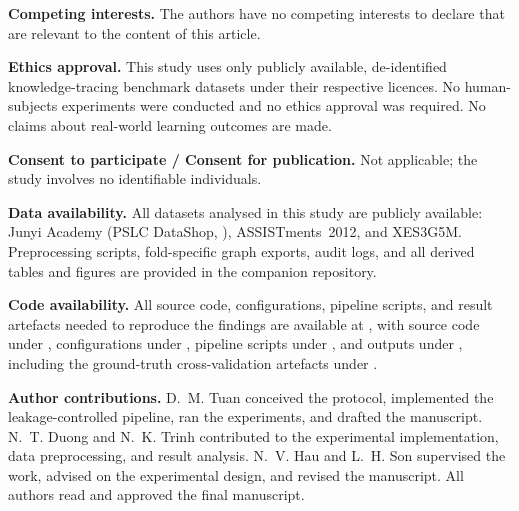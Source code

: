 \documentclass[pdflatex,sn-basic]{sn-jnl}
\begin{document}
\medskip\noindent\textbf{Competing interests.} The authors have no competing
interests to declare that are relevant to the content of this article.

\medskip\noindent\textbf{Ethics approval.} This study uses only publicly
available, de-identified knowledge-tracing benchmark datasets under their
respective licences. No human-subjects experiments were conducted and no ethics
approval was required. No claims about real-world learning outcomes are made.

\medskip\noindent\textbf{Consent to participate / Consent for publication.} Not
applicable; the study involves no identifiable individuals.

\medskip\noindent\textbf{Data availability.} All datasets analysed in this study
are publicly available: Junyi Academy (PSLC DataShop,
),
ASSISTments~2012, and XES3G5M. Preprocessing scripts, fold-specific graph
exports, audit logs, and all derived tables and figures are provided in the
companion repository.

\medskip\noindent\textbf{Code availability.} All source code, configurations,
pipeline scripts, and result artefacts needed to reproduce the findings are
available at , with source code
under , configurations under , pipeline scripts under
, and outputs under , including the ground-truth
cross-validation artefacts under .

\medskip\noindent\textbf{Author contributions.}
D.~M. Tuan conceived the protocol, implemented the leakage-controlled pipeline,
ran the experiments, and drafted the manuscript. N.~T. Duong and N.~K. Trinh
contributed to the experimental implementation, data preprocessing, and result
analysis. N.~V. Hau and L.~H. Son supervised the work, advised on the
experimental design, and revised the manuscript. All authors read and approved
the final manuscript.


\end{document}
